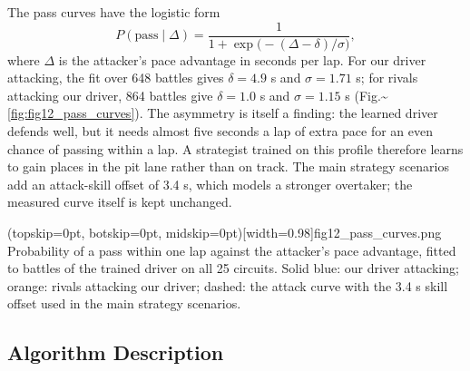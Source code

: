 \documentclass{ieeeaccess}
\begin{document}
The pass curves have the logistic form
\[P(\text{pass}\mid\Delta)=\frac{1}{1+\exp\!\big(-(\Delta-\delta)/\sigma\big)},\]
where \(\Delta\) is the attacker's pace advantage in seconds per lap. For our driver
attacking, the fit over 648 battles gives \(\delta=4.9\) s and \(\sigma=1.71\) s; for
rivals attacking our driver, 864 battles give \(\delta=1.0\) s and \(\sigma=1.15\) s
(Fig.\textasciitilde{}\ref{fig:fig12_pass_curves}). The asymmetry is itself a finding: the learned driver defends well, but it
needs almost five seconds a lap of extra pace for an even chance of passing within
a lap. A strategist trained on this profile therefore learns to gain places in the
pit lane rather than on track. The main strategy scenarios add an attack-skill
offset of 3.4 s, which models a stronger overtaker; the measured curve itself is
kept unchanged.

\Figure[t!](topskip=0pt, botskip=0pt, midskip=0pt)[width=0.98\columnwidth]{fig12_pass_curves.png}
{Probability of a pass within one lap against the attacker's pace advantage, fitted to battles of the trained driver on all 25 circuits. Solid blue: our driver attacking; orange: rivals attacking our driver; dashed: the attack curve with the 3.4 s skill offset used in the main strategy scenarios.\label{fig:fig12_pass_curves}}

\subsection{Algorithm Description}
\end{document}
